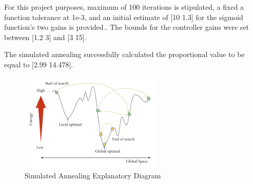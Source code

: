 For this project purposes, maximum of 100 iterations is stipulated, a fixed a function tolerance at 1e-3, and an initial estimate of [10 1.3] for the sigmoid function's two gains  is provided.. The bounds for the controller gains were set between [1.2 3] and [3 15].

The simulated annealing successfully calculated the proportional value to be equal to [2.99 14.478].

\begin{figure}[h!]
    \centering
    \includegraphics[width=0.6\textwidth]{Pictures/Controller/simulated_annealing.jpg}
    \caption{Simulated Annealing Explanatory Diagram \cite{SANN}}
    \label{fig:simulatedannealing}
\end{figure}
